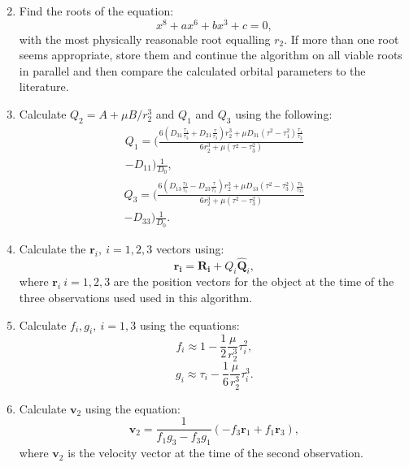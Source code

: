 \documentclass[10pt, twocolumn]{revtex4}    %
\begin{document}
\begin{enumerate}
\begin{equation}
 \end{equation}
 \item Find the roots of the equation:
 \begin{equation}
 x^8 + ax^6 +bx^3 +c = 0,
 \end{equation}
 with the most physically reasonable root equalling $r_2$. If more than one root seems appropriate, store them and continue the algorithm on all viable roots in parallel and then compare the calculated orbital parameters to the literature.
 \item Calculate $Q_2 = A + \mu B/r_2^3$ and $Q_1$ and $Q_3$ using the following:
 \begin{multline} 
 Q_1 = \Bigg( \frac{6 \left(D_{31} \frac{\tau_1}{\tau_3} +D_{21}\frac{\tau}{\tau_3}\right) r^3_2 + \mu D_{31}(\tau^2 -\tau_1^2) \frac{\tau_1}{\tau_3} }{6r_2^3 + \mu(\tau^2-\tau^2_3)} \\
 -D_{11} \Bigg) \frac{1}{D_0} ,
 \end{multline}
 \begin{multline} 
 Q_3 = \Bigg( \frac{6 \left(D_{13} \frac{\tau_3}{\tau_1} -D_{23}\frac{\tau}{\tau_1}\right) r^3_2 + \mu D_{13}(\tau^2 - \tau_3^2) \frac{\tau_3}{\tau_31} }{6r_2^3 + \mu(\tau^2-\tau^2_3)} \\ 
 - D_{33} \Bigg)\frac{1}{D_0} .
 \end{multline}
 \item Calculate the $\mathbf{r}_i,\ i=1,2,3$ vectors using:
 \begin{equation}
 \mathbf{r_i} = \mathbf{R_i} + Q_i \mathbf{\hat{Q}}_i,
 \end{equation}
 where $\mathbf{r}_i\ i=1,2,3$ are the position vectors for the object at the time of the three observations used used in this algorithm.
 \item Calculate $f_i,g_i,\ i=1,3$ using the equations:
 \begin{equation}
 f_i \approx 1 - \frac{1}{2}\frac{\mu}{r_2^3}\tau_i^2 ,
 \end{equation}
 \begin{equation}
 g_i \approx \tau_i - \frac{1}{6}\frac{\mu}{r_2^3}\tau_i^3 .
 \end{equation}
 \item Calculate $\mathbf{v}_2$ using the equation:
 \begin{equation}
 \mathbf{v}_2 = \frac{1}{f_1g_3-f_3g_1}(-f_3\mathbf{r}_1+f_1\mathbf{r}_3) ,
 \end{equation}
 where $\mathbf{v}_2$ is the velocity vector at the time of the second observation.

\end{enumerate}
\end{document}
